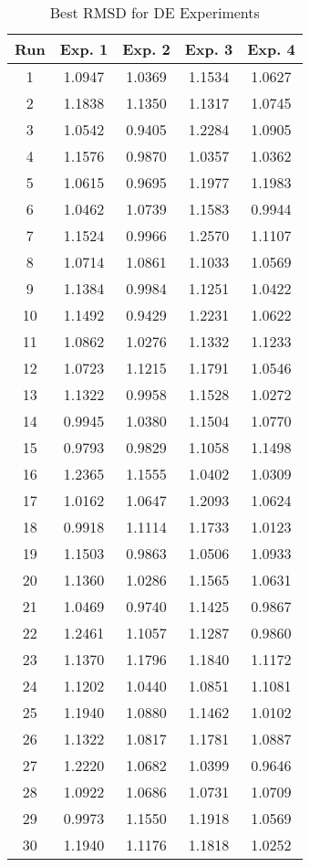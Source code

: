 \begin{table}
	\centering
	\begin{tabular}{ | c | c | c | c | c | }
		\hline
		Run & Exp. 1 & Exp. 2 & Exp. 3 & Exp. 4 \\ \hline
		1 & 1.0947 & 1.0369 & 1.1534 & 1.0627 \\ \hline
		2 & 1.1838 & 1.1350 & 1.1317 & 1.0745 \\ \hline
		3 & 1.0542 & 0.9405 & 1.2284 & 1.0905 \\ \hline
		4 & 1.1576 & 0.9870 & 1.0357 & 1.0362 \\ \hline
		5 & 1.0615 & 0.9695 & 1.1977 & 1.1983 \\ \hline
		6 & 1.0462 & 1.0739 & 1.1583 & 0.9944 \\ \hline
		7 & 1.1524 & 0.9966 & 1.2570 & 1.1107 \\ \hline
		8 & 1.0714 & 1.0861 & 1.1033 & 1.0569 \\ \hline
		9 & 1.1384 & 0.9984 & 1.1251 & 1.0422 \\ \hline
		10 & 1.1492 & 0.9429 & 1.2231 & 1.0622 \\ \hline
		11 & 1.0862 & 1.0276 & 1.1332 & 1.1233 \\ \hline
		12 & 1.0723 & 1.1215 & 1.1791 & 1.0546 \\ \hline
		13 & 1.1322 & 0.9958 & 1.1528 & 1.0272 \\ \hline
		14 & 0.9945 & 1.0380 & 1.1504 & 1.0770 \\ \hline
		15 & 0.9793 & 0.9829 & 1.1058 & 1.1498 \\ \hline
		16 & 1.2365 & 1.1555 & 1.0402 & 1.0309 \\ \hline
		17 & 1.0162 & 1.0647 & 1.2093 & 1.0624 \\ \hline
		18 & 0.9918 & 1.1114 & 1.1733 & 1.0123 \\ \hline
		19 & 1.1503 & 0.9863 & 1.0506 & 1.0933 \\ \hline
		20 & 1.1360 & 1.0286 & 1.1565 & 1.0631 \\ \hline
		21 & 1.0469 & 0.9740 & 1.1425 & 0.9867 \\ \hline
		22 & 1.2461 & 1.1057 & 1.1287 & 0.9860 \\ \hline
		23 & 1.1370 & 1.1796 & 1.1840 & 1.1172 \\ \hline
		24 & 1.1202 & 1.0440 & 1.0851 & 1.1081 \\ \hline
		25 & 1.1940 & 1.0880 & 1.1462 & 1.0102 \\ \hline
		26 & 1.1322 & 1.0817 & 1.1781 & 1.0887 \\ \hline
		27 & 1.2220 & 1.0682 & 1.0399 & 0.9646 \\ \hline
		28 & 1.0922 & 1.0686 & 1.0731 & 1.0709 \\ \hline
		29 & 0.9973 & 1.1550 & 1.1918 & 1.0569 \\ \hline
		30 & 1.1940 & 1.1176 & 1.1818 & 1.0252 \\ \hline
	\end{tabular}
	\caption{Best RMSD for DE Experiments}
\end{table}

